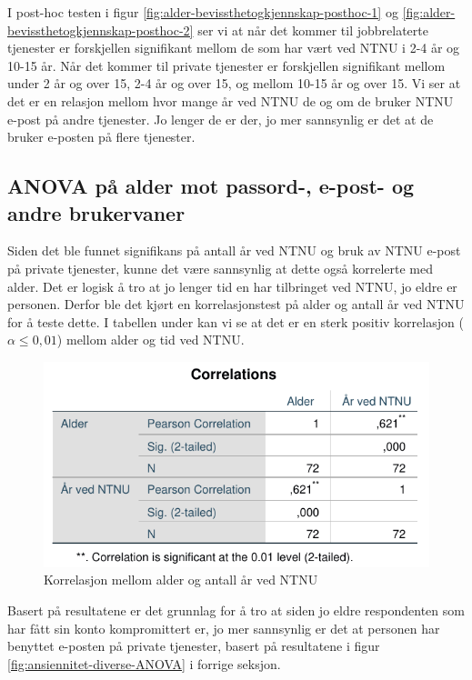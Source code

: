 I post-hoc testen i figur \ref{fig:alder-bevissthetogkjennskap-posthoc-1} og \ref{fig:alder-bevissthetogkjennskap-posthoc-2} ser vi at når det kommer til jobbrelaterte tjenester er forskjellen signifikant mellom de som har vært ved NTNU i 2-4 år og 10-15 år. Når det kommer til private tjenester er forskjellen signifikant mellom under 2 år og over 15, 2-4 år og over 15, og mellom 10-15 år og over 15. Vi ser at det er en relasjon mellom hvor mange år ved NTNU de og om de bruker NTNU e-post på andre tjenester. Jo lenger de er der, jo mer sannsynlig er det at de bruker e-posten på flere tjenester. 

\subsection{ANOVA på alder mot passord-, e-post- og andre brukervaner}
Siden det ble funnet signifikans på antall år ved NTNU og bruk av NTNU e-post på private tjenester, kunne det være sannsynlig at dette også korrelerte med alder. Det er logisk å tro at jo lenger tid en har tilbringet ved NTNU, jo eldre er personen. Derfor ble det kjørt en korrelasjonstest på alder og antall år ved NTNU for å teste dette. I tabellen under kan vi se at det er en sterk positiv korrelasjon (\(\alpha \le 0,01\)) mellom alder og tid ved NTNU.

\begin{figure}[H]
    \centering
    \includegraphics[scale=1]{case_2/bilder/spss/anova_ttest/alder_aarvedNTNU_korrelasjon.pdf}
    \caption[alder-aarvedNTNU-korrelasjon]{Korrelasjon mellom alder og antall år ved NTNU}
    \label{fig:alder-aarvedNTNU-korrelasjon}
\end{figure}

Basert på resultatene er det grunnlag for å tro at siden jo eldre respondenten som har fått sin konto kompromittert er, jo mer sannsynlig er det at personen har benyttet e-posten på private tjenester, basert på resultatene i figur \ref{fig:ansiennitet-diverse-ANOVA} i forrige seksjon.



